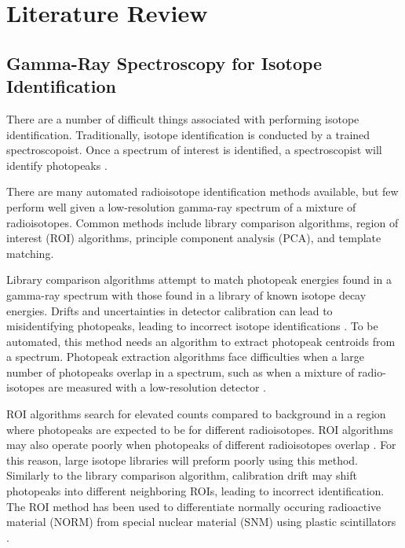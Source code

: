 \documentclass[thesis,tocnosub,noragright,centerchapter,12pt,fullpage]{uiucecethesis09}
\begin{document}









\chapter{Literature Review}


\section{Gamma-Ray Spectroscopy for Isotope Identification}

There are a number of difficult things associated with performing isotope identification. Traditionally, isotope identification is conducted by a trained spectroscopoist. Once a spectrum of interest is identified,  a spectroscopist will identify photopeaks \cite{Sullivan2010}. 

There are many automated radioisotope identification methods available, but few perform well given a low-resolution gamma-ray spectrum of a mixture of radioisotopes. Common methods include library comparison algorithms, region of interest (ROI) algorithms, principle component analysis (PCA), and template matching.

Library comparison algorithms attempt to match photopeak energies found in a gamma-ray spectrum with those found in a library of known isotope decay energies. Drifts and uncertainties in detector calibration can lead to misidentifying photopeaks, leading to incorrect isotope identifications \cite{burr2009}. To be automated, this method needs an algorithm to extract photopeak centroids from a spectrum. Photopeak extraction algorithms face difficulties when a large number of photopeaks overlap in a spectrum, such as when a mixture of radio-isotopes are measured with a low-resolution detector \cite{xiong2015}.

ROI algorithms search for elevated counts compared to background in a region where photopeaks are expected to be for different radioisotopes. ROI algorithms may also operate poorly when photopeaks of different radioisotopes overlap \cite{burr2009}. For this reason, large isotope libraries will preform poorly using this method. Similarly to the library comparison algorithm, calibration drift may shift photopeaks into different neighboring ROIs, leading to incorrect identification. The ROI method has been used to differentiate normally occuring radioactive material (NORM) from special nuclear material (SNM) using plastic scintillators \cite{Ely2006}.
\end{document}
